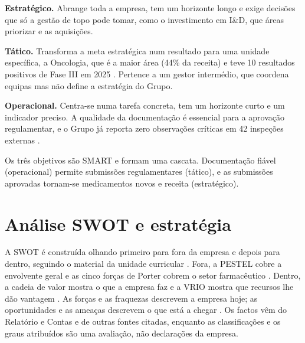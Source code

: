 \textbf{Estratégico.} Abrange toda a empresa, tem um horizonte longo e exige decisões que só a gestão de topo pode tomar, como o investimento em I\&D, que áreas priorizar e as aquisições.

\textbf{Tático.} Transforma a meta estratégica num resultado para uma unidade específica, a Oncologia, que é a maior área (44\% da receita) \cite[p.~2]{AR} e teve 10 resultados positivos de Fase III em 2025 \cite[p.~13]{AR}. Pertence a um gestor intermédio, que coordena equipas mas não define a estratégia do Grupo.

\textbf{Operacional.} Centra-se numa tarefa concreta, tem um horizonte curto e um indicador preciso. A qualidade da documentação é essencial para a aprovação regulamentar, e o Grupo já reporta zero observações críticas em 42 inspeções externas \cite[p.~4]{AR}.

\begin{analysis}
Os três objetivos são SMART e formam uma cascata. Documentação fiável (operacional) permite submissões regulamentares (tático), e as submissões aprovadas tornam-se medicamentos novos e receita (estratégico).
\end{analysis}

\section{Análise SWOT e estratégia}
A SWOT é construída olhando primeiro para fora da empresa e depois para dentro, seguindo o material da unidade curricular \cite[pp.~17--29]{PLAN}. Fora, a PESTEL cobre a envolvente geral \cite[pp.~19--21]{PLAN} e as cinco forças de Porter cobrem o setor farmacêutico \cite[pp.~21--24]{PLAN}. Dentro, a cadeia de valor mostra o que a empresa faz \cite[p.~25]{PLAN} e a VRIO mostra que recursos lhe dão vantagem \cite[p.~26]{PLAN}. As forças e as fraquezas descrevem a empresa hoje; as oportunidades e as ameaças descrevem o que está a chegar \cite[p.~27]{PLAN}. Os factos vêm do Relatório e Contas e de outras fontes citadas, enquanto as classificações e os graus atribuídos são uma avaliação, não declarações da empresa.

